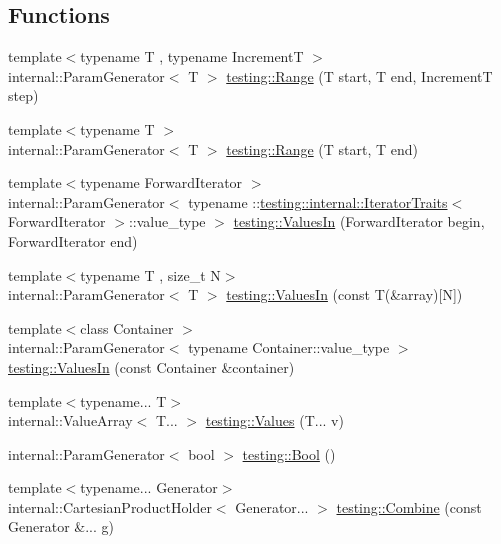 \subsection*{Functions}
\begin{DoxyCompactItemize}
\item 
{\footnotesize template$<$typename T , typename IncrementT $>$ }\\internal\+::\+Param\+Generator$<$ T $>$ \hyperlink{namespacetesting_a265ed70a86cf2d6641582c45ad9529e2}{testing\+::\+Range} (T start, T end, IncrementT step)
\item 
{\footnotesize template$<$typename T $>$ }\\internal\+::\+Param\+Generator$<$ T $>$ \hyperlink{namespacetesting_a56a45f85a1238dfc92e6fca03eb3a2e4}{testing\+::\+Range} (T start, T end)
\item 
{\footnotesize template$<$typename Forward\+Iterator $>$ }\\internal\+::\+Param\+Generator$<$ typename \+::\hyperlink{structtesting_1_1internal_1_1IteratorTraits}{testing\+::internal\+::\+Iterator\+Traits}$<$ Forward\+Iterator $>$\+::value\+\_\+type $>$ \hyperlink{namespacetesting_a96240380ae4d3b4855d07de3b84fb336}{testing\+::\+Values\+In} (Forward\+Iterator begin, Forward\+Iterator end)
\item 
{\footnotesize template$<$typename T , size\+\_\+t N$>$ }\\internal\+::\+Param\+Generator$<$ T $>$ \hyperlink{namespacetesting_a0b9ea6594ac06ad5d9eba2511ffa0fb7}{testing\+::\+Values\+In} (const T(\&array)\mbox{[}N\mbox{]})
\item 
{\footnotesize template$<$class Container $>$ }\\internal\+::\+Param\+Generator$<$ typename Container\+::value\+\_\+type $>$ \hyperlink{namespacetesting_aa67d0c8470c5f69fcfcacc9e775fa982}{testing\+::\+Values\+In} (const Container \&container)
\item 
{\footnotesize template$<$typename... T$>$ }\\internal\+::\+Value\+Array$<$ T... $>$ \hyperlink{namespacetesting_a374d4e5fbb4c938058fbe81d4c7ff6a6}{testing\+::\+Values} (T... v)
\item 
internal\+::\+Param\+Generator$<$ bool $>$ \hyperlink{namespacetesting_aa9f9150ed43f949c8a6bacf3f04c03ce}{testing\+::\+Bool} ()
\item 
{\footnotesize template$<$typename... Generator$>$ }\\internal\+::\+Cartesian\+Product\+Holder$<$ Generator... $>$ \hyperlink{namespacetesting_a2cb3b8fe262f59bf150998eb8fd0752d}{testing\+::\+Combine} (const Generator \&... g)
\end{DoxyCompactItemize}


